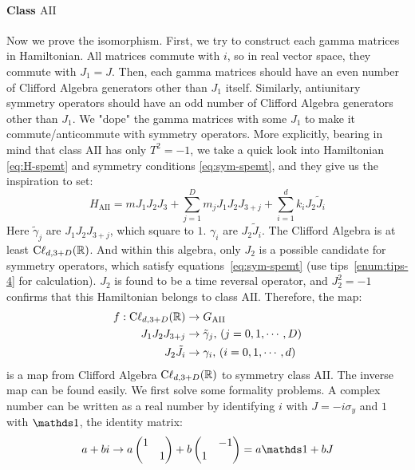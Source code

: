\paragraph{Class $\mathrm{AII}$} Now we prove the isomorphism. First, we try to
construct each gamma matrices in Hamiltonian. All matrices commute with $i$, so
in real vector space, they commute with $J_1=J$. Then, each gamma matrices
should have an even number of Clifford Algebra generators other than $J_1$
itself. Similarly, antiunitary symmetry operators should have an odd number of
Clifford Algebra generators other than $J_1$. We "dope" the gamma matrices with
some $J_1$ to make it commute/anticommute with symmetry operators. More
explicitly, bearing in mind that class $\mathrm{AII}$ has only $T^2=-1$, we
take a quick look into Hamiltonian \ref{eq:H-spemt} and symmetry conditions
\ref{eq:sym-spemt}, and they give us the inspiration to set:
\begin{equation}
    H_{\mathrm{AII}} = m J_1J_2J_3 + \sum_{j=1}^D m_jJ_1J_2J_{3+j} +
    \sum_{i=1}^d k_i J_2\tilde{J}_i
\end{equation}
Here $\tilde{\gamma}_j$ are $J_1J_2J_{3+j}$, which square to $1$. $\gamma_i$ are
$J_2\tilde{J}_i$. The Clifford Algebra is at least $\mathrm{C\ell}_{d,3+D}(\mathbb{R})$.
And within this algebra, only $J_2$ is a possible candidate for symmetry
operators, which satisfy equations~\ref{eq:sym-spemt} (use
tips~\ref{enum:tips-4} for calculation). $J_2$ is found to be a
time reversal operator, and $J_2^2=-1$ confirms that this Hamiltonian belongs to
class $\mathrm{AII}$. Therefore, the map:
\begin{align}
    f: \mathrm{C\ell}_{d,3+D}(\mathbb{R}) &\to G_{\mathrm{AII}} \\
    J_1J_2J_{3+j} &\to \tilde{\gamma}_j,\, (j=0,1,\cdots,D) \nonumber\\
    J_2 \tilde{J}_i &\to \gamma_i,\, (i=0,1,\cdots,d) \nonumber
\end{align}
is a map from Clifford Algebra $\mathrm{C\ell}_{d,3+D}(\mathbb{R})$ to symmetry class
$\mathrm{AII}$. The inverse map can be found easily. We first solve some
formality problems. A complex number can be written as a real number by
identifying $i$ with $J=-i\sigma_y$ and $1$ with $\id$, the identity matrix:
\begin{equation}
    a+bi \to a \begin{pmatrix}
        1 & \\ & 1
    \end{pmatrix} + b \begin{pmatrix}
         & -1 \\ 1 & 
    \end{pmatrix} = a\id + b J
\end{equation}
